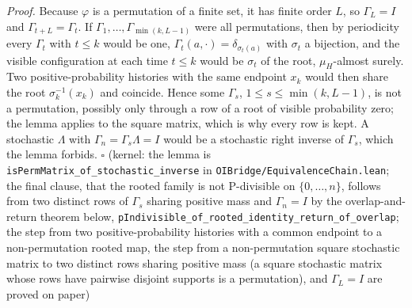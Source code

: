 \documentclass[
]{article}
\begin{document}
\emph{Proof.} Because \(\varphi\) is a permutation of a finite set, it
has finite order \(L\), so \(\Gamma_L = I\) and
\(\Gamma_{t+L} = \Gamma_t\). If
\(\Gamma_1, \ldots, \Gamma_{\min(k, L-1)}\) were all permutations, then
by periodicity every \(\Gamma_t\) with \(t \leq k\) would be one,
\(\Gamma_t(a, \cdot) = \delta_{\sigma_t(a)}\) with \(\sigma_t\) a
bijection, and the visible configuration at each time \(t \leq k\) would
be \(\sigma_t\) of the root, \(\mu_H\)-almost surely. Two
positive-probability histories with the same endpoint \(x_k\) would then
share the root \(\sigma_k^{-1}(x_k)\) and coincide. Hence some
\(\Gamma_s\), \(1 \leq s \leq \min(k, L-1)\), is not a permutation,
possibly only through a row of a root of visible probability zero; the
lemma applies to the square matrix, which is why every row is kept. A
stochastic \(\Lambda\) with \(\Gamma_n = \Gamma_s \Lambda = I\) would be
a stochastic right inverse of \(\Gamma_s\), which the lemma forbids.
\(\square\) (kernel: the lemma is
\texttt{isPermMatrix\_of\_stochastic\_inverse} in
\texttt{OIBridge/EquivalenceChain.lean}; the final clause, that the
rooted family is not P-divisible on \(\{0, \ldots, n\}\), follows from
two distinct rows of \(\Gamma_s\) sharing positive mass and
\(\Gamma_n = I\) by the overlap-and-return theorem below,
\texttt{pIndivisible\_of\_rooted\_identity\_return\_of\_overlap}; the
step from two positive-probability histories with a common endpoint to a
non-permutation rooted map, the step from a non-permutation square
stochastic matrix to two distinct rows sharing positive mass (a square
stochastic matrix whose rows have pairwise disjoint supports is a
permutation), and \(\Gamma_L = I\) are proved on paper)
\end{document}
